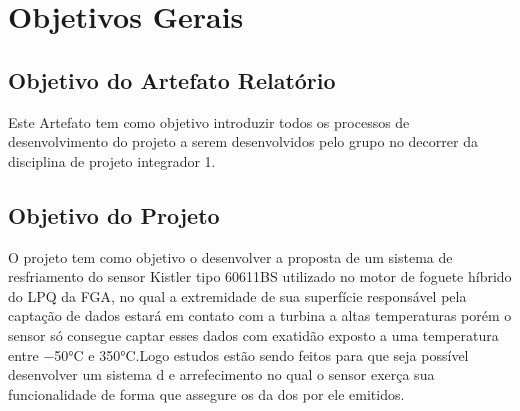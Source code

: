\chapter{Objetivos Gerais}

\section{Objetivo do Artefato Relatório}

Este Artefato tem como objetivo introduzir todos os processos de desenvolvimento do projeto a serem desenvolvidos pelo grupo no decorrer da disciplina  de projeto integrador 1.

\section{Objetivo do Projeto}

O projeto tem como objetivo o desenvolver a proposta de um sistema de resfriamento do sensor Kistler tipo 60611BS utilizado no motor de foguete híbrido  do LPQ da FGA, no qual a extremidade de sua superfície responsável pela captação de dados estará em contato com a turbina a altas temperaturas porém o sensor só consegue captar esses dados com exatidão exposto a uma temperatura entre −50°C e 350°C.Logo estudos estão sendo feitos para que seja possível desenvolver um sistema d e arrefecimento no qual o sensor exerça sua funcionalidade de forma que assegure os da dos por ele emitidos.
